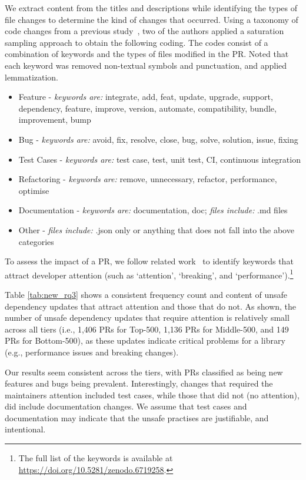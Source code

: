 \documentclass[sigconf,screen]{acmart}
\newcommand\toppkg{Top-500}
\newcommand\midpkg{Middle-500}
\newcommand\lowpkg{Bottom-500}
\begin{document}
\begin{sloppy}
We extract content from the titles and descriptions while identifying the types of file changes to determine the kind of changes that occurred.
Using a taxonomy of code changes from a previous study~\citep{Subramanian:2022}, two of the authors applied a saturation sampling approach to obtain the following coding. The codes consist of a combination of keywords and the types of files modified in the PR.
Noted that each keyword was removed non-textual symbols and punctuation, and applied lemmatization.
 \begin{itemize}
     \item Feature - \textit{keywords are: } integrate, add, feat, update, upgrade, support, dependency, feature, improve, version, automate, compatibility, bundle, improvement, bump
     \item Bug - \textit{keywords are: } avoid, fix, resolve, close, bug, solve, solution, issue, fixing
      \item Test Cases - \textit{keywords are: } test case, test, unit test, CI, continuous integration
      \item Refactoring - \textit{keywords are: } remove, unnecessary, refactor, performance, optimise
      \item Documentation - \textit{keywords are: } documentation, doc; \textit{files include: } .md files
      \item Other - \textit{files include: } .json only or anything that does not fall into the above categories
 \end{itemize}

To assess the impact of a PR, we follow related work~\citep{aom:emse2023} to identify keywords that attract developer attention (such as `attention', `breaking', and `performance').\footnote{The full list of the keywords is available at \url{https://doi.org/10.5281/zenodo.6719258}.}


Table \ref{tab:new_rq3} shows a consistent frequency count and content of unsafe dependency updates that attract attention and those that do not.
As shown, the number of unsafe dependency updates that require attention is relatively small across all tiers (i.e., 1,406 PRs for \toppkg, 1,136 PRs for \midpkg, and 149 PRs for \lowpkg), as these updates indicate critical problems for a library (e.g., performance issues and breaking changes).

Our results seem consistent across the tiers, with PRs classified as being new features and bugs being prevalent.
Interestingly, changes that required the maintainers attention included test cases, while those that did not (no attention), did include documentation changes.
We assume that test cases and documentation may indicate that the unsafe practises are justifiable, and intentional.


\end{sloppy}
\end{document}
